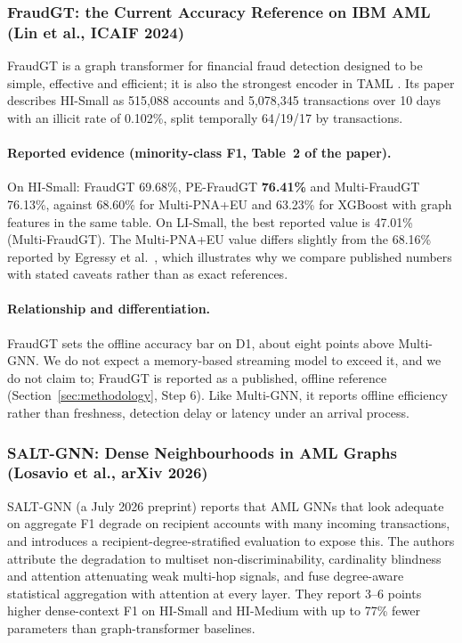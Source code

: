 \documentclass[11pt,a4paper]{article}
\begin{document}
\subsubsection{FraudGT: the Current Accuracy Reference on IBM AML (Lin et al., ICAIF 2024)}
FraudGT \cite{lin2024fraudgt} is a graph transformer for financial fraud detection designed to be simple, effective and efficient; it is also the strongest encoder in TAML \cite{rico2026taml}. Its paper describes HI-Small as 515,088 accounts and 5,078,345 transactions over 10 days with an illicit rate of 0.102\%, split temporally 64/19/17 by transactions.

\paragraph{Reported evidence (minority-class F1, Table~2 of the paper).} On HI-Small: FraudGT 69.68\%, PE-FraudGT \textbf{76.41\%} and Multi-FraudGT 76.13\%, against 68.60\% for Multi-PNA+EU and 63.23\% for XGBoost with graph features in the same table. On LI-Small, the best reported value is 47.01\% (Multi-FraudGT). The Multi-PNA+EU value differs slightly from the 68.16\% reported by Egressy et al.\ \cite{egressy2024multigraph}, which illustrates why we compare published numbers with stated caveats rather than as exact references.

\paragraph{Relationship and differentiation.} FraudGT sets the offline accuracy bar on D1, about eight points above Multi-GNN. We do not expect a memory-based streaming model to exceed it, and we do not claim to; FraudGT is reported as a published, offline reference (Section~\ref{sec:methodology}, Step 6). Like Multi-GNN, it reports offline efficiency rather than freshness, detection delay or latency under an arrival process.

\subsubsection{SALT-GNN: Dense Neighbourhoods in AML Graphs (Losavio et al., arXiv 2026)}
SALT-GNN \cite{losavio2026saltgnn} (a July 2026 preprint) reports that AML GNNs that look adequate on aggregate F1 degrade on recipient accounts with many incoming transactions, and introduces a recipient-degree-stratified evaluation to expose this. The authors attribute the degradation to multiset non-discriminability, cardinality blindness and attention attenuating weak multi-hop signals, and fuse degree-aware statistical aggregation with attention at every layer. They report 3--6 points higher dense-context F1 on HI-Small and HI-Medium with up to 77\% fewer parameters than graph-transformer baselines.
\end{document}
